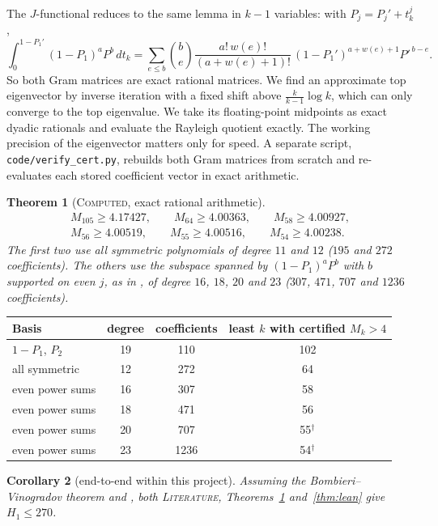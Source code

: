 \documentclass[11pt]{amsart}
\newtheorem{theorem}{Theorem}
\newtheorem{corollary}[theorem]{Corollary}
\theoremstyle{definition}
\theoremstyle{remark}
\newcommand{\lbl}[1]{\textup{\textsc{#1}}}
\begin{document}
The $J$-functional reduces to the same lemma in $k-1$ variables: with
$P_j=P_j'+t_k^j$,
\[
\int_0^{1-P_1'}(1-P_1)^aP^b\,dt_k=\sum_{e\le b}\binom{b}{e}
\frac{a!\,w(e)!}{(a+w(e)+1)!}\,(1-P_1')^{a+w(e)+1}P'^{\,b-e}.
\]
So both Gram matrices are exact rational matrices. We find an approximate top
eigenvector by inverse iteration with a fixed shift above
$\frac{k}{k-1}\log k$, which can only converge to the top eigenvalue. We take
its floating-point midpoints as exact dyadic rationals and evaluate the
Rayleigh quotient exactly. The working precision of the eigenvector matters
only for speed. A separate script, \texttt{code/verify\_cert.py}, rebuilds
both Gram matrices from scratch and re-evaluates each stored coefficient
vector in exact arithmetic.

\begin{theorem}[\lbl{Computed}, exact rational arithmetic]\label{thm:Mk}
\begin{gather*}
M_{105}\ge4.17427,\qquad M_{64}\ge4.00363,\qquad M_{58}\ge4.00927,\\
M_{56}\ge4.00519,\qquad M_{55}\ge4.00516,\qquad M_{54}\ge4.00238 .
\end{gather*}
The first two use all symmetric polynomials of degree $11$ and $12$
($195$ and $272$ coefficients). The others use the subspace spanned by
$(1-P_1)^aP^b$ with $b$ supported on even $j$, as in \cite[\S7]{Pol14b}, of
degree $16$, $18$, $20$ and $23$ ($307$, $471$, $707$ and $1236$ coefficients).
\end{theorem}

\begin{center}
\begin{tabular}{@{}lccc@{}}
\toprule
Basis & degree & coefficients & least $k$ with certified $M_k>4$\\
\midrule
$1-P_1$, $P_2$ & 19 & 110 & 102\\
all symmetric & 12 & 272 & 64\\
even power sums & 16 & 307 & 58\\
even power sums & 18 & 471 & 56\\
even power sums & 20 & 707 & 55$^{\dagger}$\\
even power sums & 23 & 1236 & 54$^{\dagger}$\\
\bottomrule
\end{tabular}
\end{center}

\begin{corollary}[end-to-end within this project]\label{cor:578}
Assuming the Bombieri--Vinogradov theorem and \cite[Prop.~4.2]{May15}, both
\lbl{Literature}, Theorems~\ref{thm:Mk} and~\ref{thm:lean} give
$H_1\le270$.
\end{corollary}
\end{document}
